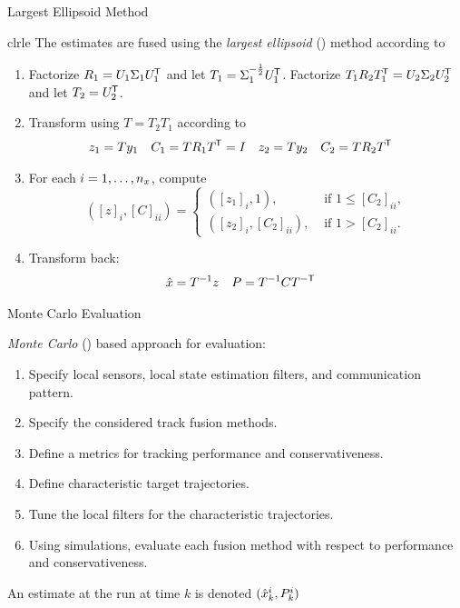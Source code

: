 \documentclass[aspectratio=1610]{beamer}
\begin{document}
\begin{frame}{Largest Ellipsoid Method}

\begin{rfshadedcolorbox}[title={Largest Ellipsoid Method},fontupper=\footnotesize]{clrle}
    The estimates are fused using the \emph{largest ellipsoid} (\abbrLE) method according to
    \begin{enumerate}
        \item Factorize $R_1=U_1\Sigma_1U_1^{\mkern-1.5mu\mathsf{T}}$ and let $T_1=\Sigma_1^{-\frac{1}{2}} U_1^{\mkern-1.5mu\mathsf{T}}$. Factorize $T_1R_2T_1^{\mkern-1.5mu\mathsf{T}}=U_2\Sigma_2U_2^{\mkern-1.5mu\mathsf{T}}$ and let $T_2=U_2^{\mkern-1.5mu\mathsf{T}}$.
        \item Transform using $T=T_2T_1$ according to
            \begin{align*}
                 z_1 &= Ty_1 & C_1 &= TR_1T^{\mkern-1.5mu\mathsf{T}}=I &
                 z_2 &= Ty_2 & C_2 &= TR_2T^{\mkern-1.5mu\mathsf{T}}
            \end{align*}
        \item For each $i=1,\dots,n_x$, compute
            \begin{equation*}
                \left([z]_i,[C]_{ii}\right) =
                    \begin{cases}
                        \left([z_1]_i,1\right), & \text{ if } 1 \leq [C_2]_{ii},\\
                        \left([z_2]_i,[C_2]_{ii}\right), & \text{ if } 1 > [C_2]_{ii}.
                    \end{cases}
            \end{equation*}
        \item Transform back:
            \begin{align*}
                \hat{x} &= T^{-1} z &
                P &= T^{-1} C T^{-\mathsf{T}}
            \end{align*}
    \end{enumerate}
\end{rfshadedcolorbox}

\end{frame}


\begin{frame}{Monte Carlo Evaluation}

\emph{Monte Carlo} (\abbrMC) based approach for evaluation:
\begin{enumerate}
	\item Specify local sensors, local state estimation filters, and communication pattern.
	\item Specify the considered track fusion methods.
	\item Define a metrics for tracking performance and conservativeness.
	\item Define characteristic target trajectories.
	\item Tune the local filters for the characteristic trajectories.
	\item Using \abbrMC simulations, evaluate each fusion method with respect to performance and conservativeness.
\end{enumerate}

An estimate at the \ith \abbrMC run at time $k$ is denoted $(\hat{x}_k^i,P_k^i)$

\end{frame}
\end{document}
